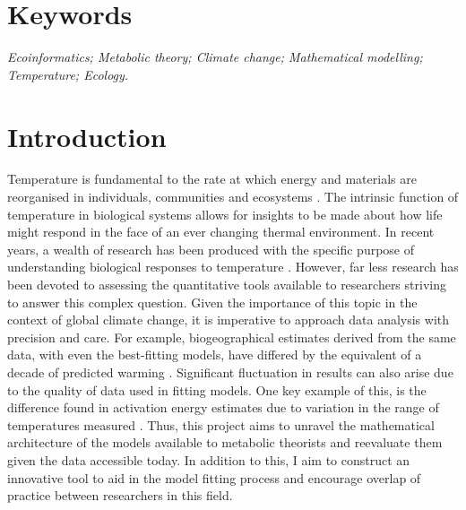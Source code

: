 \documentclass[
11pt, %
onehalfspacing, %
parskip, %
headsepline, %
]{article} %
\begin{document}
\begin{linenumbers}
\maketitle
\section*{Keywords}
\emph{Ecoinformatics; Metabolic theory; Climate change; Mathematical modelling; Temperature; Ecology.}


\maketitle
\section*{Introduction}
Temperature is fundamental to the rate at which energy and materials are reorganised in individuals, communities and ecosystems \citep{Brown2004}. The intrinsic function of temperature in biological systems allows for insights to be made about how life might respond in the face of an ever changing thermal environment. In recent years, a wealth of research has been produced with the specific purpose of understanding biological responses to temperature \citep{Dell2011} \citep{Thomas2012}. However, far less research has been devoted to assessing the quantitative tools available to researchers striving to answer this complex question. Given the importance of this topic in the context of global climate change, it is imperative to approach data analysis with precision and care. For example, biogeographical estimates derived from the same data, with even the best-fitting models, have differed by the equivalent of a decade of predicted warming \citep{Low-Decarie2017}. Significant fluctuation in results can also arise due to the quality of data used in fitting models. One key example of this, is the difference found in activation energy estimates due to variation in the range of temperatures measured \citep{Pawar2016}.
Thus, this project aims to unravel the mathematical architecture of the models available to metabolic theorists and reevaluate them given the data accessible today. In addition to this, I aim to construct an innovative tool to aid in the model fitting process and encourage overlap of practice between researchers in this field.

\maketitle

\end{linenumbers}
\end{document}
